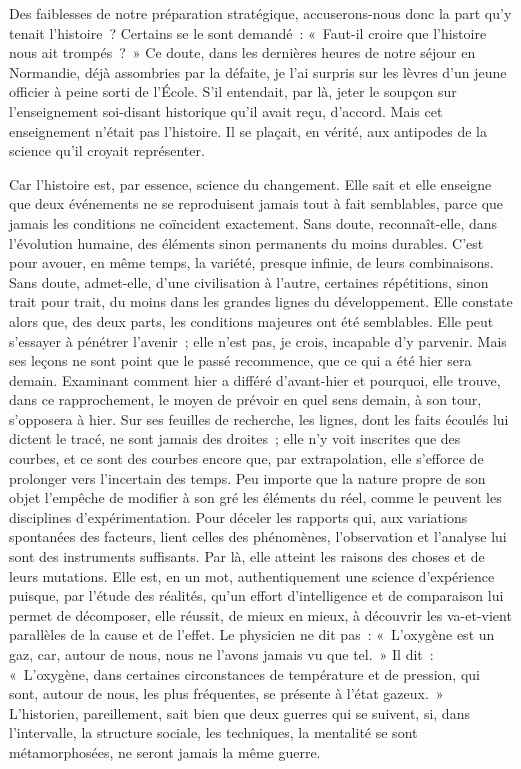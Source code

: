 \documentclass[french,twoside]{book} %
\begin{document}
Des faiblesses de notre préparation stratégique, accuserons-nous donc la part qu’y tenait l’histoire ?   Certains se le sont demandé : « Faut-il croire que l’histoire nous ait trompés ? » Ce doute, dans les dernières heures de notre séjour en Normandie, déjà assombries par la défaite, je l’ai surpris sur les lèvres d’un jeune officier à peine sorti de l’École. S’il entendait, par là, jeter le soupçon sur l’enseignement soi-disant historique qu’il avait reçu, d’accord. Mais cet enseignement n’était pas l’histoire. Il se plaçait, en vérité, aux antipodes de la science qu’il croyait représenter.\par
Car l’histoire est, par essence, science du changement. Elle sait et elle enseigne que deux événements ne se reproduisent jamais tout à fait semblables, parce que jamais les conditions ne coïncident exactement. Sans doute, reconnaît-elle, dans l’évolution humaine, des éléments sinon permanents du moins durables. C’est pour avouer, en même temps, la variété, presque infinie, de leurs combinaisons. Sans doute, admet-elle, d’une civilisation à l’autre, certaines répétitions, sinon trait pour trait, du moins dans les grandes lignes du développement. Elle constate alors que, des deux parts, les conditions majeures ont été semblables. Elle peut s’essayer à pénétrer l’avenir ; elle n’est pas, je crois, incapable d’y parvenir. Mais ses leçons ne sont point que le passé recommence, que ce qui a été hier sera demain. Examinant comment hier a différé d’avant-hier et pourquoi, elle trouve, dans ce rapprochement, le moyen de prévoir en quel sens demain, à son tour, s’opposera à hier. Sur ses feuilles de recherche, les lignes, dont les faits écoulés lui dictent le tracé, ne sont jamais des droites ; elle n’y voit inscrites que des courbes, et ce sont des courbes encore que, par extrapolation, elle s’efforce de prolonger vers l’incertain des temps. Peu importe que la nature propre de son objet l’empêche de modifier à son gré les éléments du réel, comme le peuvent les disciplines d’expérimentation. Pour déceler les rapports qui, aux variations spontanées des facteurs, lient celles des   phénomènes, l’observation et l’analyse lui sont des instruments suffisants. Par là, elle atteint les raisons des choses et de leurs mutations. Elle est, en un mot, authentiquement une science d’expérience puisque, par l’étude des réalités, qu’un effort d’intelligence et de comparaison lui permet de décomposer, elle réussit, de mieux en mieux, à découvrir les va-et-vient parallèles de la cause et de l’effet. Le physicien ne dit pas : « L’oxygène est un gaz, car, autour de nous, nous ne l’avons jamais vu que tel. » Il dit : « L’oxygène, dans certaines circonstances de température et de pression, qui sont, autour de nous, les plus fréquentes, se présente à l’état gazeux. » L’historien, pareillement, sait bien que deux guerres qui se suivent, si, dans l’intervalle, la structure sociale, les techniques, la mentalité se sont métamorphosées, ne seront jamais la même guerre.\par
\end{document}
